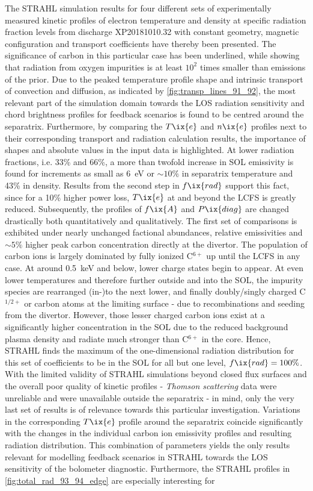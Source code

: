         The STRAHL simulation results for four different sets of experimentally measured kinetic profiles of electron temperature and density at specific radiation fraction levels from discharge XP20181010.32 with constant geometry, magnetic configuration and transport coefficients have thereby been presented. The significance of carbon in this particular case has been underlined, while showing that radiation from oxygen impurities is at least $10^{2}$ times smaller than emissions of the prior. Due to the peaked temperature profile shape and intrinsic transport of convection and diffusion, as indicated by \cref{fig:transp_lines_91_92}, the most relevant part of the simulation domain towards the LOS radiation sensitivity and chord brightness profiles for feedback scenarios is found to be centred around the separatrix. Furthermore, by comparing the $T\ix{e}$ and $n\ix{e}$ profiles next to their corresponding transport and radiation calculation results, the importance of shapes and absolute values in the input data is highlighted. At lower radiation fractions, i.e. 33\% and 66\%, a more than twofold increase in SOL emissivity is found for increments as small as \SI{6}{\electronvolt} or $\sim10\%$ in separatrix temperature and 43\% in density. Results from the second step in $f\ix{rad}$ support this fact, since for a 10\% higher power loss, $T\ix{e}$ at and beyond the LCFS is greatly reduced. Subsequently, the profiles of $f\ix{A}$ and $P\ix{diag}$ are changed drastically both quantitatively and qualitatively. The first set of comparisons is exhibited under nearly unchanged factional abundances, relative emissivities and $\sim5\%$ higher peak carbon concentration directly at the divertor. The population of carbon ions is largely dominated by fully ionized C$^{6+}$ up until the LCFS in any case. At around \SI{0.5}{\kilo\electronvolt} and below, lower charge states begin to appear. At even lower temperatures and therefore further outside and into the SOL, the impurity species are rearranged (in-)to the next lower, and finally doubly/singly charged C$^{1/2+}$ or carbon atoms at the limiting surface - due to recombinations and seeding from the divertor. However, those lesser charged carbon ions exist at a significantly higher concentration in the SOL due to the reduced background plasma density and radiate much stronger than C$^{6+}$ in the core. Hence, STRAHL finds the maximum of the one-dimensional radiation distribution for this set of coefficients to be in the SOL for all but one level, $f\ix{rad}=100\%$. With the limited validity of STRAHL simulations beyond closed flux surfaces and the overall poor quality of kinetic profiles - \textit{Thomson scattering} data were unreliable and were unavailable outside the separatrix - in mind, only the very last set of results is of relevance towards this particular investigation. Variations in the corresponding $T\ix{e}$ profile around the separatrix coincide significantly with the changes in the individual carbon ion emissivity profiles and resulting radiation distribution. This combination of parameters yields the only results relevant for modelling feedback scenarios in STRAHL towards the LOS sensitivity of the bolometer diagnostic. Furthermore, the STRAHL profiles in \cref{fig:total_rad_93_94_edge} are especially interesting for 